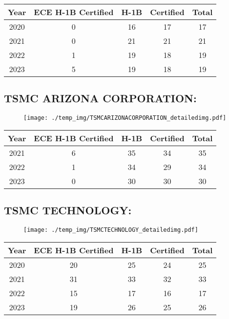 \documentclass{article}%
\begin{document}
%
\begin{longtable}{c|c|c|c|c}%
\hline%
Year&ECE H{-}1B Certified&H{-}1B&Certified&Total\\%
\hline%
2020&0&16&17&17\\%
\hline%
2021&0&21&21&21\\%
\hline%
2022&1&19&18&19\\%
\hline%
2023&5&19&18&19\\%
\hline%
\end{longtable}

%
\newpage%
\subsection{TSMC ARIZONA CORPORATION:}%
\label{subsec:TSMCARIZONACORPORATION}%
\label{TSMCARIZONACORPORATIONdetailed}%


\begin{figure}[htbp]%
\centering%
\texttt{[image: ./temp\_img/TSMCARIZONACORPORATION\_detailedimg.pdf]}%
\end{figure}

%
\begin{longtable}{c|c|c|c|c}%
\hline%
Year&ECE H{-}1B Certified&H{-}1B&Certified&Total\\%
\hline%
2021&6&35&34&35\\%
\hline%
2022&1&34&29&34\\%
\hline%
2023&0&30&30&30\\%
\hline%
\end{longtable}

%
\newpage%
\subsection{TSMC TECHNOLOGY:}%
\label{subsec:TSMCTECHNOLOGY}%
\label{TSMCTECHNOLOGYdetailed}%


\begin{figure}[htbp]%
\centering%
\texttt{[image: ./temp\_img/TSMCTECHNOLOGY\_detailedimg.pdf]}%
\end{figure}

%
\begin{longtable}{c|c|c|c|c}%
\hline%
Year&ECE H{-}1B Certified&H{-}1B&Certified&Total\\%
\hline%
2020&20&25&24&25\\%
\hline%
2021&31&33&32&33\\%
\hline%
2022&15&17&16&17\\%
\hline%
2023&19&26&25&26\\%
\hline%
\end{longtable}
\end{document}
